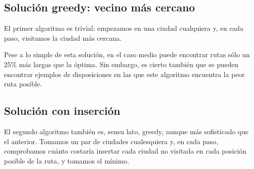 \documentclass[a4paper, 11pt]{article}
\begin{document}
\subsection{Solución greedy: vecino más cercano}
El primer algoritmo es trivial: empezamos en una ciudad cualquiera y, en cada paso, visitamos la ciudad más cercana.

Pese a lo simple de esta solución, en el caso medio puede encontrar rutas sólo un 25\% más largas que la óptima. Sin embargo, es cierto también que se pueden encontrar ejemplos de disposiciones en las que este algoritmo encuentra la peor ruta posible.

\subsection{Solución con inserción}
El segundo algoritmo también es, sensu lato, greedy, aunque más sofisticado que el anterior. Tomamos un par de ciudades cualesquiera y, en cada paso, comprobamos cuánto costaría insertar cada ciudad no visitada en cada posición posible de la ruta, y tomamos el mínimo. 
\end{document}
